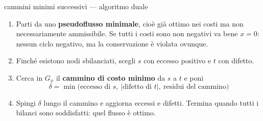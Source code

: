 \documentclass[11pt,a4paper]{article}
\begin{document}
\begin{ric}{cammini minimi successivi --- algoritmo duale}
\begin{enumerate}
\item Parti da uno \textbf{pseudoflusso minimale}, cioè già ottimo nei costi
      ma non necessariamente ammissibile.
      Se tutti i costi sono non negativi va bene $x = 0$: nessun ciclo negativo,
      ma la conservazione è violata ovunque.
\item Finché esistono nodi sbilanciati, scegli $s$ con eccesso positivo e $t$ con difetto.
\item Cerca in $G_x$ il \textbf{cammino di costo minimo} da $s$ a $t$ e poni
      \[ \delta = \min\big(\text{eccesso di } s,\ |\text{difetto di } t|,\ \text{residui del cammino}\big) \]
\item Spingi $\delta$ lungo il cammino e aggiorna eccessi e difetti.
      Termina quando tutti i bilanci sono soddisfatti: quel flusso è ottimo.
\end{enumerate}
\end{ric}
\end{document}
